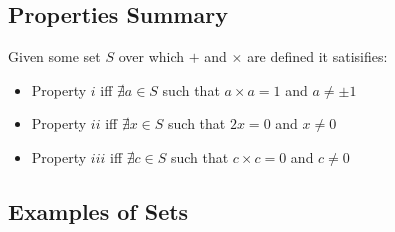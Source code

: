 \documentclass{article}
\begin{document}
  \subsection{Properties Summary}
  Given some set $S$ over which $+$ and $\times$ are defined it satisifies:
  \begin{itemize}
  \item Property $i$ iff $\nexists a \in S$ such that $a \times a = 1$ and $a \neq \pm 1$
  \item Property $ii$ iff $\nexists x \in S$ such that $2x = 0$ and $x \neq 0$
  \item Property $iii$ iff $\nexists c \in S$ such that $c \times c = 0$ and $c \neq 0$
  \end{itemize}
  \subsection{Examples of Sets}
\end{document}
